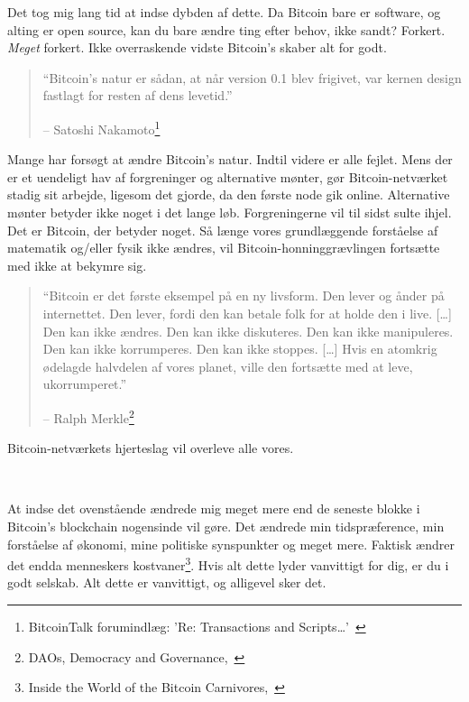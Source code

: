 Det tog mig lang tid at indse dybden af dette. Da Bitcoin
bare er software, og alting er open source, kan du bare ændre
ting efter behov, ikke sandt? Forkert. \textit{Meget} forkert. Ikke overraskende vidste
Bitcoin's skaber alt for godt.

\begin{quotation}\begin{samepage}
\enquote{Bitcoin's natur er sådan, at når version 0.1 blev frigivet, var kernen
design fastlagt for resten af dens levetid.}
\begin{flushright} -- Satoshi Nakamoto\footnote{BitcoinTalk forumindlæg: 'Re:
Transactions and Scripts\ldots'~\cite{satoshi-set-in-stone}}
\end{flushright}\end{samepage}\end{quotation}

Mange har forsøgt at ændre Bitcoin's natur. Indtil videre er alle
fejlet. Mens der er et uendeligt hav af forgreninger og alternative mønter,
gør Bitcoin-netværket stadig sit arbejde, ligesom det gjorde, da den første
node gik online. Alternative mønter betyder ikke noget i det lange løb. Forgreningerne
vil til sidst sulte ihjel. Det er Bitcoin, der betyder noget. Så længe vores
grundlæggende forståelse af matematik og/eller fysik ikke ændres,
vil Bitcoin-honninggrævlingen fortsætte med ikke at bekymre sig.

\begin{quotation}\begin{samepage}
\enquote{Bitcoin er det første eksempel på en ny livsform. Den lever og ånder
på internettet. Den lever, fordi den kan betale folk for at holde
den i live. [\ldots] Den kan ikke ændres. Den kan ikke diskuteres. Den
kan ikke manipuleres. Den kan ikke korrumperes. Den kan ikke stoppes.
[\ldots] Hvis en atomkrig ødelagde halvdelen af vores planet, ville den fortsætte
med at leve, ukorrumperet.}
\begin{flushright} -- Ralph Merkle\footnote{DAOs, Democracy and
Governance,~\cite{merkle-dao}}
\end{flushright}\end{samepage}\end{quotation}

Bitcoin-netværkets hjerteslag vil overleve alle vores.

~

At indse det ovenstående ændrede mig meget mere end de seneste blokke i Bitcoin's
blockchain nogensinde vil gøre. Det ændrede min tidspræference, min forståelse af
økonomi, mine politiske synspunkter og meget mere. Faktisk ændrer det endda
menneskers kostvaner\footnote{Inside the World of the Bitcoin
Carnivores,~\cite{carnivores}}. Hvis alt dette lyder vanvittigt for dig, er du i
godt selskab. Alt dette er vanvittigt, og alligevel sker det.

